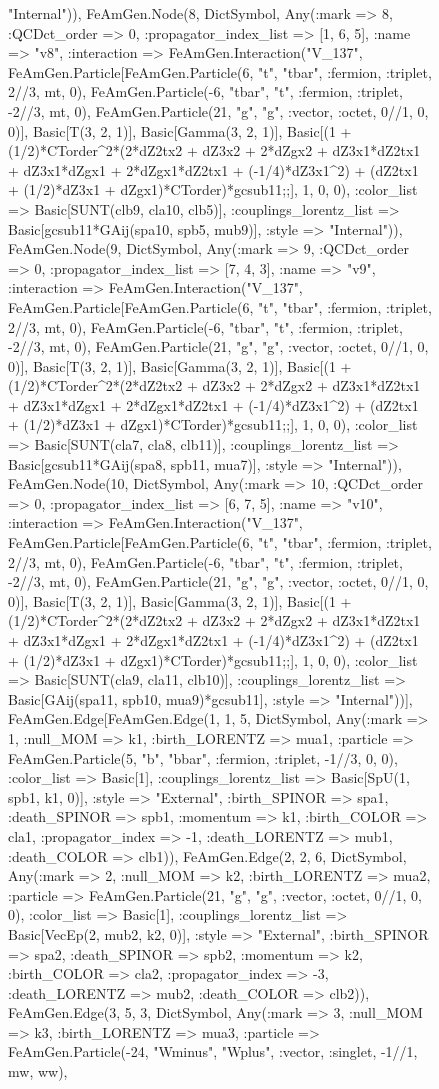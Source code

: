 \documentclass{revtex4}
\begin{document}
\begin{figure}[!htb]
\begin{center}
{"Internal")), FeAmGen.Node(8, Dict{Symbol, Any}(:mark => 8, :QCDct_order => 0, :propagator_index_list => [1, 6, 5], :name => "v8", :interaction => FeAmGen.Interaction("V_137", FeAmGen.Particle[FeAmGen.Particle(6, "t", "tbar", :fermion, :triplet, 2//3, mt, 0), FeAmGen.Particle(-6, "tbar", "t", :fermion, :triplet, -2//3, mt, 0), FeAmGen.Particle(21, "g", "g", :vector, :octet, 0//1, 0, 0)], Basic[T(3, 2, 1)], Basic[Gamma(3, 2, 1)], Basic[(1 + (1/2)*CTorder^2*(2*dZ2tx2 + dZ3x2 + 2*dZgx2 + dZ3x1*dZ2tx1 + dZ3x1*dZgx1 + 2*dZgx1*dZ2tx1 + (-1/4)*dZ3x1^2) + (dZ2tx1 + (1/2)*dZ3x1 + dZgx1)*CTorder)*gcsub11;;], 1, 0, 0), :color_list => Basic[SUNT(clb9, cla10, clb5)], :couplings_lorentz_list => Basic[gcsub11*GAij(spa10, spb5, mub9)], :style => "Internal")), FeAmGen.Node(9, Dict{Symbol, Any}(:mark => 9, :QCDct_order => 0, :propagator_index_list => [7, 4, 3], :name => "v9", :interaction => FeAmGen.Interaction("V_137", FeAmGen.Particle[FeAmGen.Particle(6, "t", "tbar", :fermion, :triplet, 2//3, mt, 0), FeAmGen.Particle(-6, "tbar", "t", :fermion, :triplet, -2//3, mt, 0), FeAmGen.Particle(21, "g", "g", :vector, :octet, 0//1, 0, 0)], Basic[T(3, 2, 1)], Basic[Gamma(3, 2, 1)], Basic[(1 + (1/2)*CTorder^2*(2*dZ2tx2 + dZ3x2 + 2*dZgx2 + dZ3x1*dZ2tx1 + dZ3x1*dZgx1 + 2*dZgx1*dZ2tx1 + (-1/4)*dZ3x1^2) + (dZ2tx1 + (1/2)*dZ3x1 + dZgx1)*CTorder)*gcsub11;;], 1, 0, 0), :color_list => Basic[SUNT(cla7, cla8, clb11)], :couplings_lorentz_list => Basic[gcsub11*GAij(spa8, spb11, mua7)], :style => "Internal")), FeAmGen.Node(10, Dict{Symbol, Any}(:mark => 10, :QCDct_order => 0, :propagator_index_list => [6, 7, 5], :name => "v10", :interaction => FeAmGen.Interaction("V_137", FeAmGen.Particle[FeAmGen.Particle(6, "t", "tbar", :fermion, :triplet, 2//3, mt, 0), FeAmGen.Particle(-6, "tbar", "t", :fermion, :triplet, -2//3, mt, 0), FeAmGen.Particle(21, "g", "g", :vector, :octet, 0//1, 0, 0)], Basic[T(3, 2, 1)], Basic[Gamma(3, 2, 1)], Basic[(1 + (1/2)*CTorder^2*(2*dZ2tx2 + dZ3x2 + 2*dZgx2 + dZ3x1*dZ2tx1 + dZ3x1*dZgx1 + 2*dZgx1*dZ2tx1 + (-1/4)*dZ3x1^2) + (dZ2tx1 + (1/2)*dZ3x1 + dZgx1)*CTorder)*gcsub11;;], 1, 0, 0), :color_list => Basic[SUNT(cla9, cla11, clb10)], :couplings_lorentz_list => Basic[GAij(spa11, spb10, mua9)*gcsub11], :style => "Internal"))], FeAmGen.Edge[FeAmGen.Edge(1, 1, 5, Dict{Symbol, Any}(:mark => 1, :null_MOM => k1, :birth_LORENTZ => mua1, :particle => FeAmGen.Particle(5, "b", "bbar", :fermion, :triplet, -1//3, 0, 0), :color_list => Basic[1], :couplings_lorentz_list => Basic[SpU(1, spb1, k1, 0)], :style => "External", :birth_SPINOR => spa1, :death_SPINOR => spb1, :momentum => k1, :birth_COLOR => cla1, :propagator_index => -1, :death_LORENTZ => mub1, :death_COLOR => clb1)), FeAmGen.Edge(2, 2, 6, Dict{Symbol, Any}(:mark => 2, :null_MOM => k2, :birth_LORENTZ => mua2, :particle => FeAmGen.Particle(21, "g", "g", :vector, :octet, 0//1, 0, 0), :color_list => Basic[1], :couplings_lorentz_list => Basic[VecEp(2, mub2, k2, 0)], :style => "External", :birth_SPINOR => spa2, :death_SPINOR => spb2, :momentum => k2, :birth_COLOR => cla2, :propagator_index => -3, :death_LORENTZ => mub2, :death_COLOR => clb2)), FeAmGen.Edge(3, 5, 3, Dict{Symbol, Any}(:mark => 3, :null_MOM => k3, :birth_LORENTZ => mua3, :particle => FeAmGen.Particle(-24, "Wminus", "Wplus", :vector, :singlet, -1//1, mw, ww), }
\end{center}
\end{figure}
\end{document}
